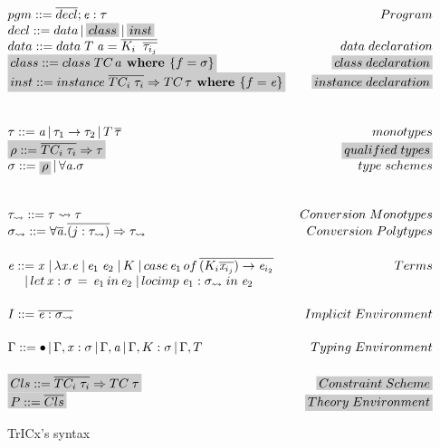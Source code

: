 \begin{figure}
   \[
\begin{array}{@{\hspace{0mm}}l@{\hspace{0mm}}}
  pgm ::= \overline{decl};\term:\type\hfill Program\\
  decl ::= data\,|\,\highlight{class}\,|\,\highlight{inst}\\
  data ::= data\;T\;\tyVar=\overline{K_i \;\; \overline{\type_{i_j}}}\hfill data\;declaration\\
  \highlight{class ::=class\; TC\,a\textbf{ where }\{f=\typeS\}} \hfill \highlight{class\;declaration}\\
  \highlight{inst ::=instance\; \overline{TC_i\;\type_i}\Rightarrow TC \,\type\textbf{ where }\{f=\term\}} \hfill \highlight{instance \; declaration}\\
  \\[5mm]
  \type ::= \tyVar\,|\,\type_1\to\type_2\,|\,T\,\overline{\type}\hfill monotypes\\
  \highlight{\qtype ::= \overline{TC_i\;\type_i} \Rightarrow \type} \hfill \highlight{qualified\;types}\\
  \typeS ::= \highlight{\qtype}\,|\,\forall\tyVar.\typeS\hfill type\;schemes\\
  \\[5mm]
    \type_{\rightsquigarrow} ::= \type \rightsquigarrow \type\hfill Conversion\;Monotypes\\
  \typeS_{\rightsquigarrow} ::= \forall \overline {\tyVar} . \overline{(j : \type_{\rightsquigarrow})} \Rightarrow \type_{\rightsquigarrow}\hfill Conversion\;Polytypes
  \\[5mm]
  \term ::= \tmVar\;|\,\lambda \tmVar.\term\;|\,\term_1 \; \term_2\;|\, K \;|\, case \, \term_1 \, of\, \overline{(K_i \overline{\tmVar_{i_j}}) \rightarrow \term_{i_2}} \hfill Terms\\
  \phantom{\term ::}|\, let \, \tmVar : \typeS \, =\, \term_1 \,in\, \term_2  \;|\, locimp \; \term_1 : \typeS_{\rightsquigarrow}\; in\; \term_2
  \\[5mm]
  \imEnv::=\overline{\term : \typeS_{\rightsquigarrow}} \hfill Implicit\;Environment
  \\[5mm]
  \tyEnv::=\bullet\,|\,\tyEnv,\tmVar:\typeS\,|\,\tyEnv,\tyVar\,|\,\tyEnv,K:\typeS\,|\,\tyEnv,T \hfill \phantom{xxxxxxxxxxxxxxx} Typing\; Environment\\[5mm]
  \highlight{Cls::=\overline{TC_i\;\type_i}\Rightarrow TC\;\type}\hfill \highlight{Constraint\;Scheme}\\
  \highlight{P ::= \overline{Cls}}\hfill \highlight{Theory\;Environment}

  \end{array}
\]
  \caption{TrICx's syntax}
  \label{tcsyntax}
\end{figure}

